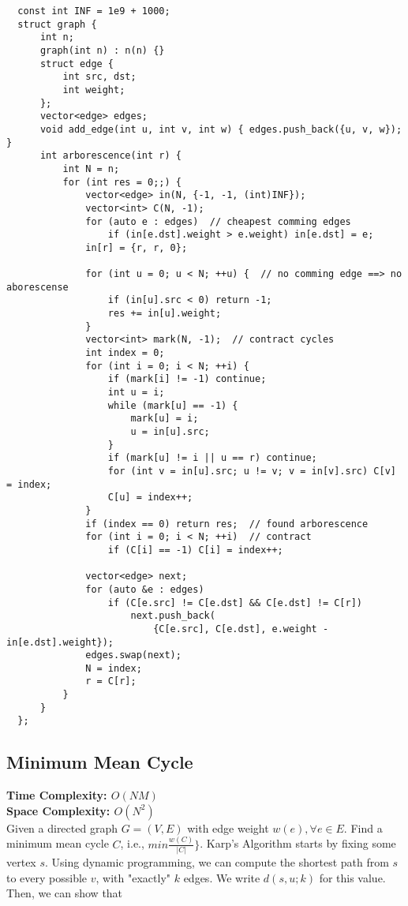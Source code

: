 \begin{lstlisting}
  const int INF = 1e9 + 1000;
  struct graph {
      int n;
      graph(int n) : n(n) {}
      struct edge {
          int src, dst;
          int weight;
      };
      vector<edge> edges;
      void add_edge(int u, int v, int w) { edges.push_back({u, v, w}); }
      int arborescence(int r) {
          int N = n;
          for (int res = 0;;) {
              vector<edge> in(N, {-1, -1, (int)INF});
              vector<int> C(N, -1);
              for (auto e : edges)  // cheapest comming edges
                  if (in[e.dst].weight > e.weight) in[e.dst] = e;
              in[r] = {r, r, 0};
  
              for (int u = 0; u < N; ++u) {  // no comming edge ==> no aborescense
                  if (in[u].src < 0) return -1;
                  res += in[u].weight;
              }
              vector<int> mark(N, -1);  // contract cycles
              int index = 0;
              for (int i = 0; i < N; ++i) {
                  if (mark[i] != -1) continue;
                  int u = i;
                  while (mark[u] == -1) {
                      mark[u] = i;
                      u = in[u].src;
                  }
                  if (mark[u] != i || u == r) continue;
                  for (int v = in[u].src; u != v; v = in[v].src) C[v] = index;
                  C[u] = index++;
              }
              if (index == 0) return res;  // found arborescence
              for (int i = 0; i < N; ++i)  // contract
                  if (C[i] == -1) C[i] = index++;
  
              vector<edge> next;
              for (auto &e : edges)
                  if (C[e.src] != C[e.dst] && C[e.dst] != C[r])
                      next.push_back(
                          {C[e.src], C[e.dst], e.weight - in[e.dst].weight});
              edges.swap(next);
              N = index;
              r = C[r];
          }
      }
  };
\end{lstlisting}

\newpage

\subsection{Minimum Mean Cycle}

\textbf{Time Complexity: $O(NM)$}\\
\textbf{Space Complexity: $O(N^2)$}\\

Given a directed graph $G = (V, E)$ with edge weight $w(e), \forall e \in E$.
\newline
Find a minimum mean cycle $C$, i.e., $min \frac{w(C)}{|C|} \}$.
\newline
\newline
Karp's Algorithm \cite{Karp1978Jan} starts by fixing some vertex $s$. 
Using dynamic programming, we can compute
the shortest path from $s$ to every possible $v$, with "exactly" $k$ edges.
We write $d(s,u;k)$ for this value.
Then, we can show that


